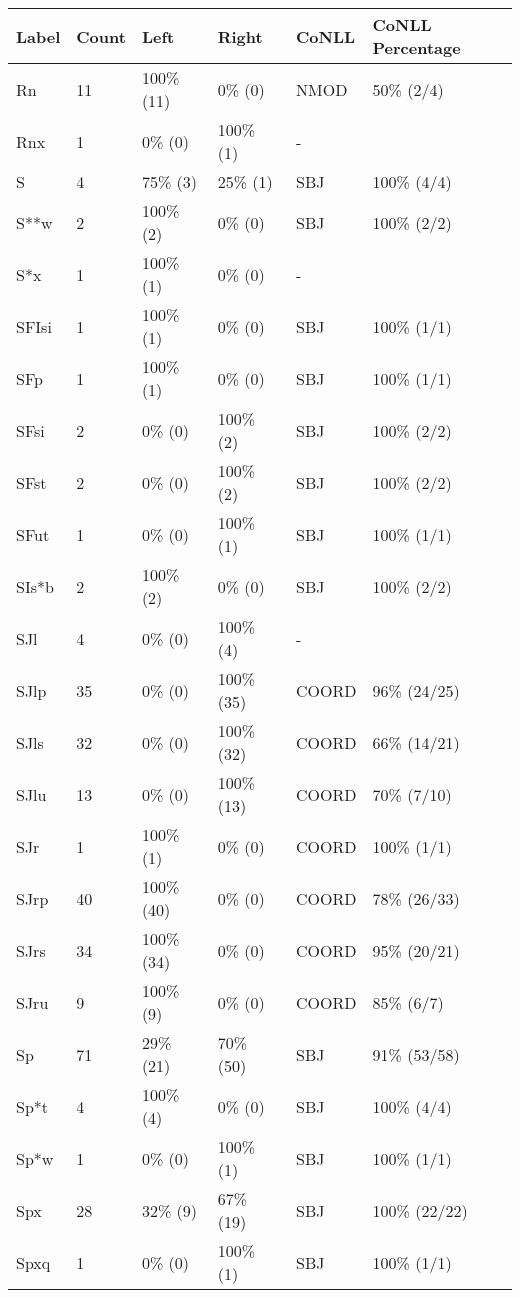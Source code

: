 \begin{figure*}
\begin{tabular}{|l|l|l|l||l|l|}
\hline
Label & Count & Left & Right & CoNLL & CoNLL Percentage\\ 
\hline
 Rn & 11 & 100\% (11) & 0\% (0) & NMOD & 50\% (2/4) \\ 
\hline
 Rnx & 1 & 0\% (0) & 100\% (1) & - &  \\ 
\hline
 S & 4 & 75\% (3) & 25\% (1) & SBJ & 100\% (4/4) \\ 
\hline
 S**w & 2 & 100\% (2) & 0\% (0) & SBJ & 100\% (2/2) \\ 
\hline
 S*x & 1 & 100\% (1) & 0\% (0) & - &  \\ 
\hline
 SFIsi & 1 & 100\% (1) & 0\% (0) & SBJ & 100\% (1/1) \\ 
\hline
 SFp & 1 & 100\% (1) & 0\% (0) & SBJ & 100\% (1/1) \\ 
\hline
 SFsi & 2 & 0\% (0) & 100\% (2) & SBJ & 100\% (2/2) \\ 
\hline
 SFst & 2 & 0\% (0) & 100\% (2) & SBJ & 100\% (2/2) \\ 
\hline
 SFut & 1 & 0\% (0) & 100\% (1) & SBJ & 100\% (1/1) \\ 
\hline
 SIs*b & 2 & 100\% (2) & 0\% (0) & SBJ & 100\% (2/2) \\ 
\hline
 SJl & 4 & 0\% (0) & 100\% (4) & - &  \\ 
\hline
 SJlp & 35 & 0\% (0) & 100\% (35) & COORD & 96\% (24/25) \\ 
\hline
 SJls & 32 & 0\% (0) & 100\% (32) & COORD & 66\% (14/21) \\ 
\hline
 SJlu & 13 & 0\% (0) & 100\% (13) & COORD & 70\% (7/10) \\ 
\hline
 SJr & 1 & 100\% (1) & 0\% (0) & COORD & 100\% (1/1) \\ 
\hline
 SJrp & 40 & 100\% (40) & 0\% (0) & COORD & 78\% (26/33) \\ 
\hline
 SJrs & 34 & 100\% (34) & 0\% (0) & COORD & 95\% (20/21) \\ 
\hline
 SJru & 9 & 100\% (9) & 0\% (0) & COORD & 85\% (6/7) \\ 
\hline
 Sp & 71 & 29\% (21) & 70\% (50) & SBJ & 91\% (53/58) \\ 
\hline
 Sp*t & 4 & 100\% (4) & 0\% (0) & SBJ & 100\% (4/4) \\ 
\hline
 Sp*w & 1 & 0\% (0) & 100\% (1) & SBJ & 100\% (1/1) \\ 
\hline
 Spx & 28 & 32\% (9) & 67\% (19) & SBJ & 100\% (22/22) \\ 
\hline
 Spxq & 1 & 0\% (0) & 100\% (1) & SBJ & 100\% (1/1) \\ 

\end{tabular}
\end{figure*}
